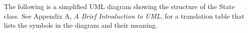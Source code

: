 
\pagebreak


The following is a simplified UML diagram showing the structure of the
State class.  See Appendix A, {\it A Brief Introduction to UML},
for a translation table that lists the symbols in the diagram and their 
meaning.


